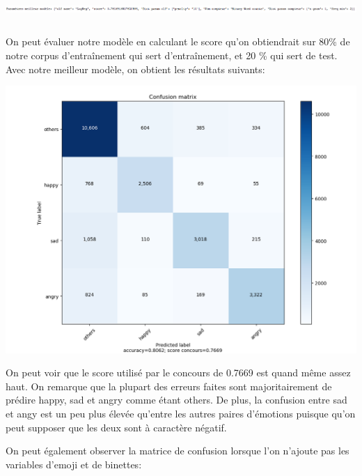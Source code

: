 \documentclass[12pt,french]{article}
\begin{document}
\includegraphics[width=\linewidth,height=1cm,keepaspectratio]{dict_meilleur_model}

On peut évaluer notre modèle en calculant le score qu'on obtiendrait sur 80\% de notre corpus d'entraînement qui sert d'entraînement, et 20 \% qui sert de test. Avec notre meilleur modèle, on obtient les résultats suivants:

\includegraphics[width=\linewidth,keepaspectratio]{confusion_matrix_avec_features}

On peut voir que le score utilisé par le concours de 0.7669 est quand même assez haut. On remarque que la plupart des erreurs faites sont majoritairement de prédire happy, sad et angry comme étant others. De plus, la confusion entre sad et angy est un peu plus élevée qu'entre les autres paires d'émotions puisque qu'on peut supposer que les deux sont à caractère négatif.

On peut également observer la matrice de confusion lorsque l'on n'ajoute pas les variables d'emoji et de binettes:
\end{document}
